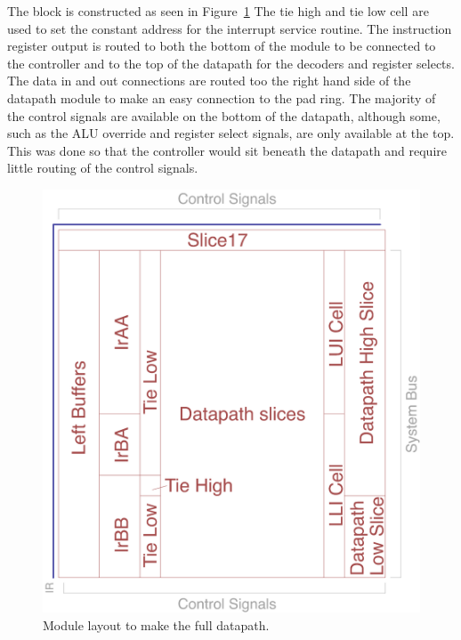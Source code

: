 The block is constructed as seen in Figure~\ref{fig:datapath:block}
The tie high and tie low cell are used to set the constant address for the interrupt service routine.
The instruction register output is routed to both the bottom of the module to be connected to the controller and to the top of the datapath for the decoders and register selects.
The data in and out connections are routed too the right hand side of the datapath module to make an easy connection to the pad ring. 
The majority of the control signals are available on the bottom of the datapath, although some, such as the ALU override and register select signals, are only available at the top. 
This was done so that the controller would sit beneath the datapath and require little routing of the control signals.

\begin{figure}
\includegraphics[width=\textwidth]{../../eagle/Datapath/datapath.png}
\caption{Module layout to make the full datapath.}
\label{fig:datapath:block}
\end{figure}


